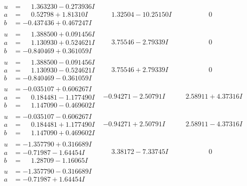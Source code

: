 \documentclass[1p]{elsarticle_modified}
\theoremstyle{definition}
\begin{document}
$$\begin{array}{c|c|c}
 \hline 
\begin{aligned}
u &= \phantom{-}1.363230 - 0.273936 I \\
a &= \phantom{-}0.52798 + 1.81310 I \\
b &= -0.437436 + 0.467247 I\end{aligned}
 & \phantom{-}1.32504 - 10.25150 I & \phantom{-0.000000 } 0 \\ \hline\begin{aligned}
u &= \phantom{-}1.388500 + 0.091456 I \\
a &= \phantom{-}1.130930 + 0.524621 I \\
b &= -0.840469 + 0.361059 I\end{aligned}
 & \phantom{-}3.75546 - 2.79339 I & \phantom{-0.000000 } 0 \\ \hline\begin{aligned}
u &= \phantom{-}1.388500 - 0.091456 I \\
a &= \phantom{-}1.130930 - 0.524621 I \\
b &= -0.840469 - 0.361059 I\end{aligned}
 & \phantom{-}3.75546 + 2.79339 I & \phantom{-0.000000 } 0 \\ \hline\begin{aligned}
u &= -0.035107 + 0.606267 I \\
a &= \phantom{-}0.184481 - 1.177490 I \\
b &= \phantom{-}1.147090 - 0.469602 I\end{aligned}
 & -0.94271 - 2.50791 I & \phantom{-}2.58911 + 4.37316 I \\ \hline\begin{aligned}
u &= -0.035107 - 0.606267 I \\
a &= \phantom{-}0.184481 + 1.177490 I \\
b &= \phantom{-}1.147090 + 0.469602 I\end{aligned}
 & -0.94271 + 2.50791 I & \phantom{-}2.58911 - 4.37316 I \\ \hline\begin{aligned}
u &= -1.357790 + 0.316689 I \\
a &= -0.71987 - 1.64454 I \\
b &= \phantom{-}1.28709 - 1.16065 I\end{aligned}
 & \phantom{-}3.38172 - 7.33745 I & \phantom{-0.000000 } 0 \\ \hline\begin{aligned}
u &= -1.357790 - 0.316689 I \\
a &= -0.71987 + 1.64454 I \\

\end{aligned}
\end{array}$$
\end{document}
